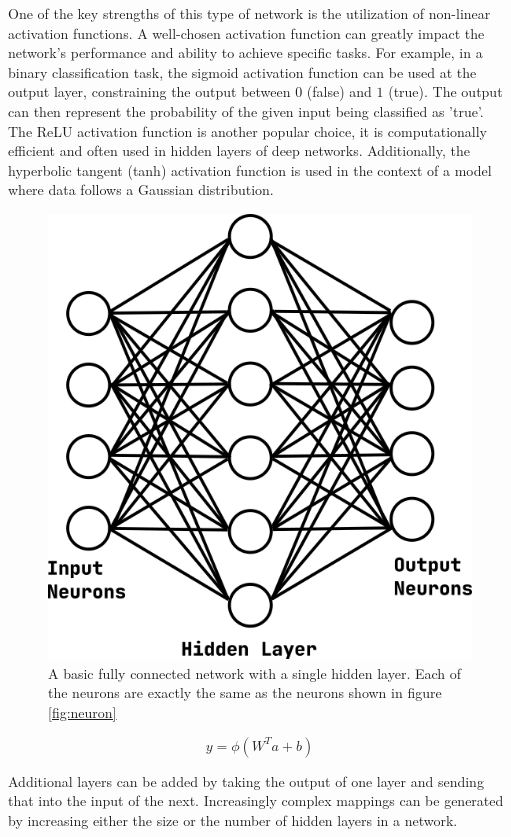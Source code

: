 One of the key strengths of this type of network is the utilization of non-linear activation functions. A well-chosen activation function can greatly impact the network's performance and ability to achieve specific tasks. For example, in a binary classification task, the sigmoid activation function can be used at the output layer, constraining the output between $0$ (false) and $1$ (true). The output can then represent the probability of the given input being classified as 'true'. The ReLU activation function is another popular choice, it is computationally efficient and often used in hidden layers of deep networks. Additionally, the hyperbolic tangent (tanh) activation function is used in the context of a model where data follows a Gaussian distribution. 

\begin{figure}[h!]
    \centering
    \includegraphics[width=0.7\linewidth]{figs/background/png/fcn.png}
    \caption{A basic fully connected network with a single hidden layer. Each of the neurons are exactly the same as the neurons shown in figure \ref{fig:neuron}}
    \label{fig:fcn}
\end{figure}

\begin{equation}
    y = \phi(W^{T}a + b)
    \label{eq:fcn}
\end{equation}

Additional layers can be added by taking the output of one layer and sending that into the input of the next. Increasingly complex mappings can be generated by increasing either the size or the number of hidden layers in a network.

